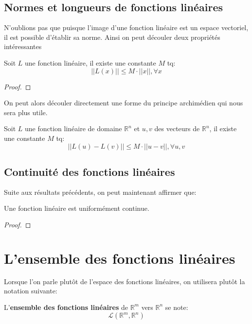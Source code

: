 \documentclass[12pt]{report}
\let\Bbb\mathbb
\theoremstyle{definition}
\begin{document}
    \subsection{Normes et longueurs de fonctions linéaires}
    N'oublions pas que puisque l'image d'une fonction linéaire est un 
    espace vectoriel, il est possible d'établir sa norme. Ainsi on peut découler
    deux propriétés intéressantes
    \begin{prop}
        \label{thm:principe_archimedien}
        Soit $L$ une fonction linéaire, il existe une constante $M$ tq:
        $$ ||L(x)|| \leq M \cdot ||x||, \forall x $$
    \end{prop}
    \begin{proof}
    \end{proof}
    On peut alors découler directement une forme du principe archimédien qui 
    nous sera plus utile.
    \begin{prop}
        \label{thm:principe_archimedien_2}
        Soit $L$ une fonction linéaire de domaine $\Bbb R^n$ et $u, v$ des vecteurs de $\Bbb R^n$, il existe une constante $M$ tq:
        $$ ||L(u) - L(v)|| \leq M \cdot ||u - v||, \forall u,v $$
    \end{prop}
    \subsection{Continuité des fonctions linéaires}
    Suite aux résultats précédents, on peut maintenant affirmer que:
    \begin{prop}
        \label{thm:continuite_uniforme_fonction_lineaire}
        Une fonction linéaire est uniformément continue.
    \end{prop}
    \begin{proof}
    \end{proof}
\section{L'ensemble des fonctions linéaires}
    Lorsque l'on parle plutôt de l'espace des fonctions linéaires, on utilisera plutôt
    la notation suivante:

    \begin{defi}
        \label{def:ensemble_fonctions_lineaires}
        L'\textbf{ensemble des fonctions linéaires} de $\Bbb R^m$ vers $\Bbb R^n$ se note:
        $$\mathcal{L}(\Bbb R^m, \Bbb R^n)$$
    \end{defi}
\end{document}
